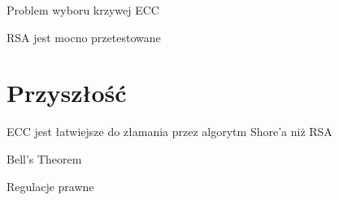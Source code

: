 \documentclass{beamer}
\begin{document}
\begin{frame}{Problem wyboru krzywej ECC}
\end{frame}

\begin{frame}{RSA jest mocno przetestowane}
\end{frame}

\section{Przyszłość}
\begin{frame}{ECC jest łatwiejsze do złamania przez algorytm Shore'a niż RSA}
    
\end{frame}
\begin{frame}{Bell's Theorem} %
    
\end{frame}

\begin{frame}{Regulacje prawne}
    
\end{frame}
\end{document}
